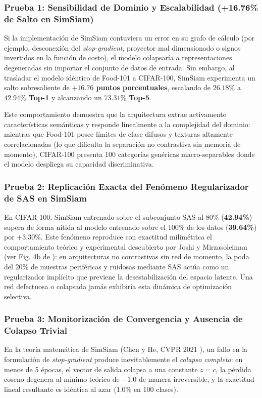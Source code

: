 \subsubsection{Prueba 1: Sensibilidad de Dominio y Escalabilidad (+16.76\% de Salto en SimSiam)}
Si la implementación de SimSiam contuviera un error en su grafo de cálculo (por ejemplo, desconexión del \textit{stop-gradient}, proyector mal dimensionado o signos invertidos en la función de costo), el modelo colapsaría a representaciones degeneradas sin importar el conjunto de datos de entrada. Sin embargo, al trasladar el modelo idéntico de Food-101 a CIFAR-100, SimSiam experimenta un salto sobresaliente de \textbf{$+16.76$ puntos porcentuales}, escalando de $26.18\%$ a \textbf{$42.94\%$ Top-1} y alcanzando un \textbf{$73.31\%$ Top-5}. 

Este comportamiento demuestra que la arquitectura extrae activamente características semánticas y responde linealmente a la complejidad del dominio: mientras que Food-101 posee límites de clase difusos y texturas altamente correlacionadas (lo que dificulta la separación no contrastiva sin memoria de momento), CIFAR-100 presenta 100 categorías genéricas macro-separables donde el modelo despliega su capacidad discriminativa.

\subsubsection{Prueba 2: Replicación Exacta del Fenómeno Regularizador de SAS en SimSiam}
En CIFAR-100, SimSiam entrenado sobre el subconjunto SAS al 80\% (\textbf{42.94\%}) supera de forma nítida al modelo entrenado sobre el 100\% de los datos (\textbf{39.64\%}) por $+3.30\%$. Este fenómeno reproduce con exactitud milimétrica el comportamiento teórico y experimental descubierto por Joshi y Mirzasoleiman (ver Fig. 4b de \cite{joshi2023sas}): en arquitecturas no contrastivas sin red de momento, la poda del 20\% de muestras periféricas y ruidosas mediante SAS actúa como un regularizador implícito que previene la desestabilización del espacio latente. Una red defectuosa o colapsada jamás exhibiría esta dinámica de optimización selectiva.

\subsubsection{Prueba 3: Monitorización de Convergencia y Ausencia de Colapso Trivial}
En la teoría matemática de SimSiam (Chen y He, CVPR 2021 \cite{chen2021simsiam}), un fallo en la formulación de \textit{stop-gradient} produce inevitablemente el \textit{colapso completo}: en menos de 5 épocas, el vector de salida colapsa a una constante $z = c$, la pérdida coseno degenera al mínimo teórico de $-1.0$ de manera irreversible, y la exactitud lineal resultante es idéntica al azar ($1.0\%$ en 100 clases). 

